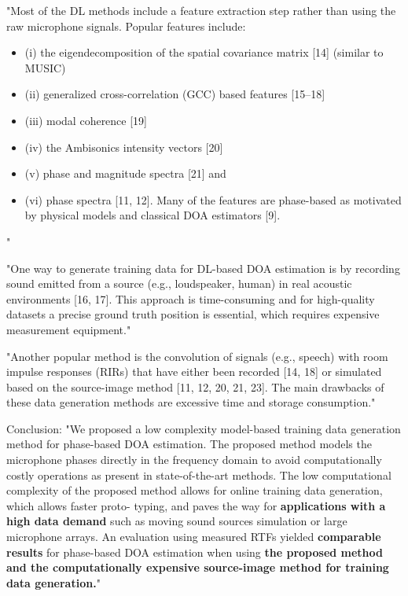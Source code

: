\documentclass{article}
\begin{document}
"Most of the DL methods include a feature extraction step rather than using the raw microphone signals. Popular features include:

\begin{itemize}
    \item (i) the eigendecomposition of the spatial covariance matrix [14] (similar to MUSIC)
    \item (ii) generalized cross-correlation (GCC) based features [15–18]
    \item (iii) modal coherence [19]
    \item (iv) the Ambisonics intensity vectors [20]
    \item (v) phase and magnitude spectra [21] and
    \item (vi) phase spectra [11, 12]. Many of the features are phase-based as motivated by physical models and classical DOA estimators [9].
\end{itemize}
"

"One way to generate training data for DL-based DOA estimation is by recording sound emitted from a source (e.g., loudspeaker, human) in real acoustic environments [16, 17]. This approach is time-consuming and for high-quality datasets a precise ground truth position is essential, which requires expensive measurement equipment."

"Another popular method is the convolution of signals (e.g., speech) with room impulse responses (RIRs) that have either been recorded [14, 18] or simulated based on the source-image method [11, 12, 20, 21, 23]. The main drawbacks of these data generation methods are excessive time and storage consumption."


Conclusion: 
"We proposed a low complexity model-based training data
generation method for phase-based DOA estimation. The
proposed method models the microphone phases directly
in the frequency domain to avoid computationally costly
operations as present in state-of-the-art methods. The low
computational complexity of the proposed method allows for
online training data generation, which allows faster proto-
typing, and paves the way for \textbf{applications with a high data
demand} such as moving sound sources simulation or large
microphone arrays. An evaluation using measured RTFs
yielded \textbf{comparable results} for phase-based DOA estimation
when using \textbf{the proposed method and the computationally
expensive source-image method for training data generation.}"

\end{document}
